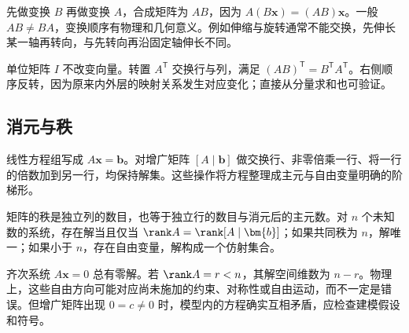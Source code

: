 \documentclass[11pt,openany,fontset=fandol]{ctexbook}
\theoremstyle{plain}\newtheorem{theorem}{定理}[chapter]\newtheorem{proposition}[theorem]{命题}
\theoremstyle{definition}\newtheorem{definition}{定义}[chapter]\newtheorem{example}{例}[chapter]
\theoremstyle{remark}\newtheorem*{remark}{说明}
\newcommand{\vct}[1]{\bm{#1}}\newcommand{\Rea}{\operatorname{Re}}\newcommand{\Ima}{\operatorname{Im}}
\begin{document}
先做变换 $B$ 再做变换 $A$，合成矩阵为 $AB$，因为 $A(B\vct x)=(AB)\vct x$。一般 $AB\ne BA$，变换顺序有物理和几何意义。例如伸缩与旋转通常不能交换，先伸长某一轴再转向，与先转向再沿固定轴伸长不同。

单位矩阵 $I$ 不改变向量。转置 $A^{\mathsf T}$ 交换行与列，满足 $(AB)^{\mathsf T}=B^{\mathsf T}A^{\mathsf T}$。右侧顺序反转，因为原来内外层的映射关系发生对应变化；直接从分量求和也可验证。

\subsection{消元与秩}
线性方程组写成 $A\vct x=\vct b$。对增广矩阵 $[A\mid\vct b]$ 做交换行、非零倍乘一行、将一行的倍数加到另一行，均保持解集。这些操作将方程整理成主元与自由变量明确的阶梯形。

矩阵的秩是独立列的数目，也等于独立行的数目与消元后的主元数。对 $n$ 个未知数的系统，存在解当且仅当 $\rank A=\rank[A\mid\vct b]$；如果共同秩为 $n$，解唯一；如果小于 $n$，存在自由变量，解构成一个仿射集合。

齐次系统 $A\vct x=0$ 总有零解。若 $\rank A=r<n$，其解空间维数为 $n-r$。物理上，这些自由方向可能对应尚未施加的约束、对称性或自由运动，而不一定是错误。但增广矩阵出现 $0=c\ne0$ 时，模型内的方程确实互相矛盾，应检查建模假设和符号。
\end{document}
